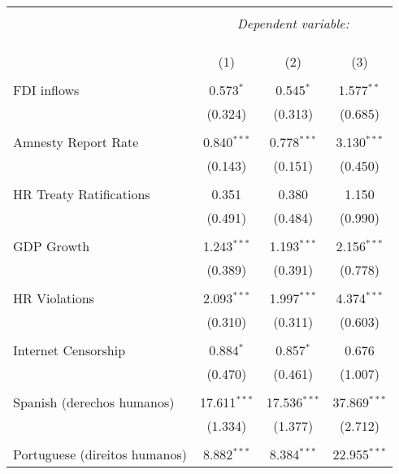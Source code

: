 
\begin{table}[!htbp] \centering 
  \caption{} 
  \label{} 
\begin{tabular}{@{\extracolsep{5pt}}lccc} 
\\[-1.8ex]\hline 
\hline \\[-1.8ex] 
 & \multicolumn{3}{c}{\textit{Dependent variable:}} \\ 
\cline{2-4} 
\\[-1.8ex] & \multicolumn{3}{c}{ } \\ 
\\[-1.8ex] & (1) & (2) & (3)\\ 
\hline \\[-1.8ex] 
 FDI inflows & 0.573$^{*}$ & 0.545$^{*}$ & 1.577$^{**}$ \\ 
  & (0.324) & (0.313) & (0.685) \\ 
  & & & \\ 
 Amnesty Report Rate & 0.840$^{***}$ & 0.778$^{***}$ & 3.130$^{***}$ \\ 
  & (0.143) & (0.151) & (0.450) \\ 
  & & & \\ 
 HR Treaty Ratifications & 0.351 & 0.380 & 1.150 \\ 
  & (0.491) & (0.484) & (0.990) \\ 
  & & & \\ 
 GDP Growth & 1.243$^{***}$ & 1.193$^{***}$ & 2.156$^{***}$ \\ 
  & (0.389) & (0.391) & (0.778) \\ 
  & & & \\ 
 HR Violations & 2.093$^{***}$ & 1.997$^{***}$ & 4.374$^{***}$ \\ 
  & (0.310) & (0.311) & (0.603) \\ 
  & & & \\ 
 Internet Censorship & 0.884$^{*}$ & 0.857$^{*}$ & 0.676 \\ 
  & (0.470) & (0.461) & (1.007) \\ 
  & & & \\ 
 Spanish (derechos humanos) & 17.611$^{***}$ & 17.536$^{***}$ & 37.869$^{***}$ \\ 
  & (1.334) & (1.377) & (2.712) \\ 
  & & & \\ 
 Portuguese (direitos humanos) & 8.882$^{***}$ & 8.384$^{***}$ & 22.955$^{***}$ \\ 

\end{tabular}
\end{table}

